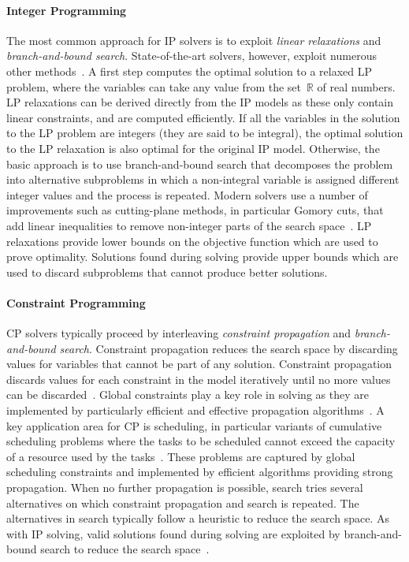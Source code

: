 \documentclass[acmsmall,authorversion,nonacm]{acmart}
\newcommand{\RR}{\ensuremath{\mathbb R}}
\begin{document}
\paragraph{Integer Programming}

The most common approach for IP solvers is to exploit \emph{linear
  relaxations} and \emph{branch-and-bound search}.
State-of-the-art solvers, however, exploit numerous other
methods~\cite{Nemhauser1999}.
A first step computes the optimal solution to a relaxed LP problem,
where the variables can take any value from the set~$\RR$ of real
numbers.
LP relaxations can be derived directly from the IP models as these
only contain linear constraints, and are computed efficiently.
If all the variables in the solution to the LP problem are integers
(they are said to be integral), the optimal solution to the LP
relaxation is also optimal for the original IP model.
Otherwise, the basic approach is to use branch-and-bound search that
decomposes the problem into alternative subproblems in which a
non-integral variable is assigned different integer values and the
process is repeated. Modern solvers use a number of improvements such
as cutting-plane methods, in particular Gomory cuts, that add linear
inequalities to remove non-integer parts of the search
space~\cite{Nemhauser1999}.
LP relaxations provide lower bounds on the objective function which
are used to prove optimality.
Solutions found during solving provide upper bounds which are used to
discard subproblems that cannot produce better solutions.

\paragraph{Constraint Programming}

CP solvers typically proceed by interleaving \emph{constraint
  propagation} and \emph{branch-and-bound search}.
Constraint propagation reduces the search space by discarding values
for variables that cannot be part of any solution.
Constraint propagation discards values for each constraint in the
model iteratively until no more values can be
discarded~\cite{CPH:prop}.
Global constraints play a key role in solving as they are implemented
by particularly efficient and effective propagation
algorithms~\cite{CPH:global}.
A key application area for CP is scheduling, in particular variants of
cumulative scheduling problems where the tasks to be scheduled cannot
exceed the capacity of a resource used by the
tasks~\cite{Baptiste2001,CPH:scheduling}. These problems are
captured by global scheduling constraints and implemented
by efficient algorithms providing strong propagation.
When no further propagation is possible, search tries several
alternatives on which constraint propagation and search is repeated.
The alternatives in search typically follow a heuristic to reduce the
search space.
As with IP solving, valid solutions found during solving are exploited
by branch-and-bound search to reduce the search
space~\cite{CPH:search}.
\end{document}
